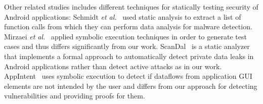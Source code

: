 Other related studies includes different techniques for statically testing 
security of Android applications: Schmidt \emph{et al.}~\cite{schmidt2009static} used static analysis to extract a 
list of function calls from which they can perform data analysis for malware 
detection. Mirzaei \emph{et al.}~\cite{mirzaei2012testing} applied symbolic execution techniques in order to generate test cases and thus differs significantly from our work. ScanDal~\cite{kim2012scandal} is a static analyzer that implements a formal approach to automatically detect private data leaks in Android applications rather than detect active attacks as in our work. AppIntent~\cite{AppIntent} uses symbolic execution to detect if dataflows from application GUI elements are not intended by the user and differs from our approach for detecting vulnerabilities and providing proofs for them. 



